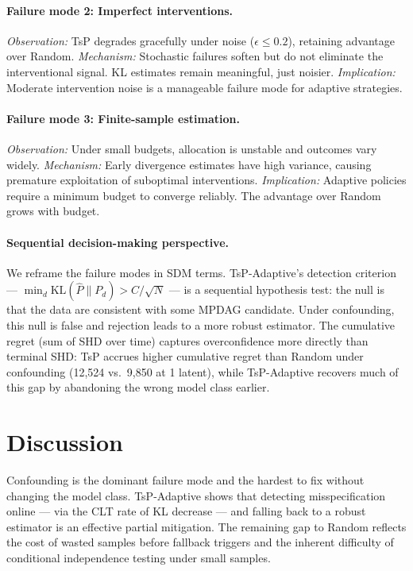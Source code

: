 \documentclass{article}
\begin{document}
\paragraph{Failure mode 2: Imperfect interventions.}
\emph{Observation:} TsP degrades gracefully under noise ($\epsilon \leq 0.2$), retaining advantage over Random.
\emph{Mechanism:} Stochastic failures soften but do not eliminate the interventional signal. KL estimates remain meaningful, just noisier.
\emph{Implication:} Moderate intervention noise is a manageable failure mode for adaptive strategies.

\paragraph{Failure mode 3: Finite-sample estimation.}
\emph{Observation:} Under small budgets, allocation is unstable and outcomes vary widely.
\emph{Mechanism:} Early divergence estimates have high variance, causing premature exploitation of suboptimal interventions.
\emph{Implication:} Adaptive policies require a minimum budget to converge reliably. The advantage over Random grows with budget.

\paragraph{Sequential decision-making perspective.}
We reframe the failure modes in SDM terms. TsP-Adaptive's detection criterion — $\min_d \text{KL}(\hat{P} \| P_d) > C/\sqrt{N}$ — is a sequential hypothesis test: the null is that the data are consistent with some MPDAG candidate. Under confounding, this null is false and rejection leads to a more robust estimator. The cumulative regret (sum of SHD over time) captures overconfidence more directly than terminal SHD: TsP accrues higher cumulative regret than Random under confounding (12,524 vs.\ 9,850 at 1 latent), while TsP-Adaptive recovers much of this gap by abandoning the wrong model class earlier.

\section{Discussion}
Confounding is the dominant failure mode and the hardest to fix without changing the model class. TsP-Adaptive shows that detecting misspecification online — via the CLT rate of KL decrease — and falling back to a robust estimator is an effective partial mitigation. The remaining gap to Random reflects the cost of wasted samples before fallback triggers and the inherent difficulty of conditional independence testing under small samples.
\end{document}
